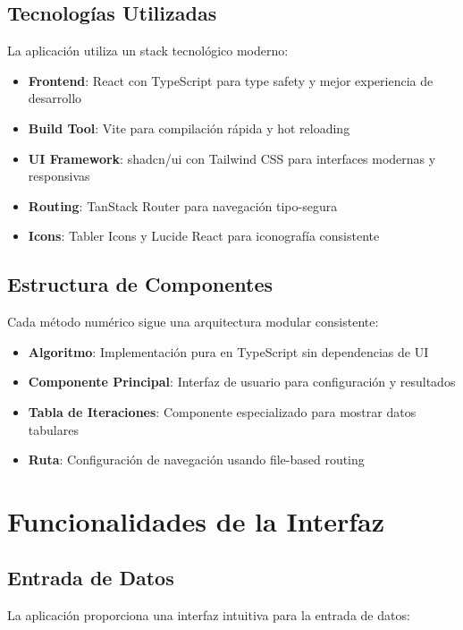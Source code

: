 \subsection{Tecnologías Utilizadas}

La aplicación utiliza un stack tecnológico moderno:

\begin{itemize}
    \item \textbf{Frontend}: React con TypeScript para type safety y mejor experiencia de desarrollo
    \item \textbf{Build Tool}: Vite para compilación rápida y hot reloading
    \item \textbf{UI Framework}: shadcn/ui con Tailwind CSS para interfaces modernas y responsivas
    \item \textbf{Routing}: TanStack Router para navegación tipo-segura
    \item \textbf{Icons}: Tabler Icons y Lucide React para iconografía consistente
\end{itemize}

\subsection{Estructura de Componentes}

Cada método numérico sigue una arquitectura modular consistente:

\begin{itemize}
    \item \textbf{Algoritmo}: Implementación pura en TypeScript sin dependencias de UI
    \item \textbf{Componente Principal}: Interfaz de usuario para configuración y resultados
    \item \textbf{Tabla de Iteraciones}: Componente especializado para mostrar datos tabulares
    \item \textbf{Ruta}: Configuración de navegación usando file-based routing
\end{itemize}

\section{Funcionalidades de la Interfaz}

\subsection{Entrada de Datos}

La aplicación proporciona una interfaz intuitiva para la entrada de datos:

